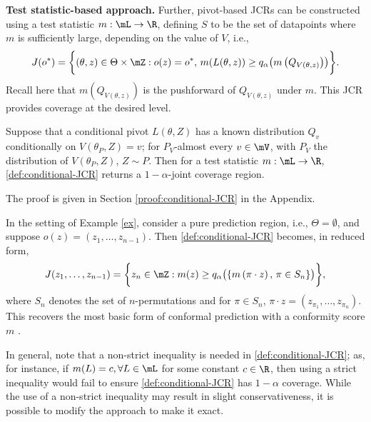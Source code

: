 \documentclass[english]{article}
\begin{document}
{\bf Test statistic-based approach.}
Further, 
pivot-based JCRs can be constructed using a test statistic $m:\mL\to \R$, 
defining $S$ to be the set of 
datapoints where $m$ is sufficiently large, depending on the value of $V$, i.e., 
\begin{align}\label{def:conditional-JCR}
    J(o^*)= \biggl\{(\theta,z) 
\in\Theta\times\mZ: 
o(z) = o^*,\,
m(L(\theta,z)) \ge q_{\alpha}\bigl(m\left(Q_{V\left(\theta,z\right)}\right)\bigr) \biggr\}.
\end{align}
Recall here that $m\left(Q_{V\left(\theta,z\right)}\right)$ is the pushforward of $Q_{V\left(\theta,z\right)}$ under $m$.
This JCR provides coverage at the desired level. 
\begin{theorem}\label{thm:conditional-JCR}
Suppose that a conditional pivot $L(\theta,Z)$ has a known distribution $Q_v$ conditionally on $V(\theta_P,Z)=v$; 
for $P_V$-almost every $v\in\mV$, with $P_V$ the distribution of $V(\theta_P,Z)$, $Z\sim P$. Then for a test statistic $m: \mL\to \R$, 
\eqref{def:conditional-JCR} returns a $1-\alpha$-joint coverage region. 
\end{theorem}

The proof is given in Section \ref{proof:conditional-JCR} in the Appendix. 

\begin{example}
In the setting of Example \ref{ex},
consider a pure prediction region, i.e., $\Theta = \emptyset$, 
and suppose $o(z) = (z_1, \ldots, z_{n-1})$. 
Then \eqref{def:conditional-JCR} becomes, in reduced form,
$$
J(z_1, \ldots, z_{n-1})= \biggl\{z_n \in\mZ:
m(z) \ge q_{\alpha}\bigl(\{m\left(\pi\cdot z\right),\, \pi \in S_n\}\bigr) \biggr\},
$$
where $S_n$ denotes the set of $n$-permutations and for $\pi\in S_n$, $\pi \cdot z = (z_{\pi_1}, \ldots, z_{\pi_n})$.
This recovers the most basic form of conformal prediction with a conformity score $m$
\citep{saunders1999transduction,vovk2005algorithmic}.
\end{example}



In general, note that a non-strict inequality is needed in \eqref{def:conditional-JCR};
as, for instance, if $m(L) = c, \forall L \in \mL$ for some constant $c \in \R$, then 
  using a strict inequality would fail to ensure \eqref{def:conditional-JCR} has $1-\alpha$ coverage.
  While the use of a non-strict inequality may result in slight conservativeness, 
  it is possible to modify the approach to make it exact.
\end{document}
